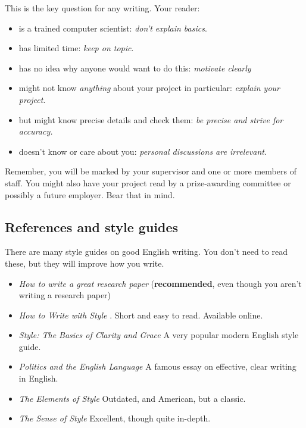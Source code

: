 \documentclass{l4proj}
\begin{document}
This is the key question for any writing. Your reader:

\begin{itemize}
    \item
          is a trained computer scientist: \emph{don't explain basics}.
    \item
          has limited time: \emph{keep on topic}.
    \item
          has no idea why anyone would want to do this: \emph{motivate clearly}
    \item
          might not know \emph{anything} about your project in particular:
          \emph{explain your project}.
    \item
          but might know precise details and check them: \emph{be precise and
              strive for accuracy.}
    \item
          doesn't know or care about you: \emph{personal discussions are
              irrelevant}.
\end{itemize}

Remember, you will be marked by your supervisor and one or more members
of staff. You might also have your project read by a prize-awarding
committee or possibly a future employer. Bear that in mind.

\subsection{References and style guides}
There are many style guides on good English writing. You don't need to
read these, but they will improve how you write.

\begin{itemize}
    \item
          \emph{How to write a great research paper} \cite{Pey17} (\textbf{recommended}, even
          though you aren't writing a research paper)
    \item
          \emph{How to Write with Style} \cite{Von80}. Short and easy to read. Available online.
    \item
          \emph{Style: The Basics of Clarity and Grace} \cite{Wil09} A very popular modern English 
          style guide.
    \item
          \emph{Politics and the English Language} \cite{Orw68}  A famous essay on effective, clear
          writing in English.
    \item
          \emph{The Elements of Style} \cite{StrWhi07} Outdated, and American, but a classic.
    \item
          \emph{The Sense of Style} \cite{Pin15} Excellent, though quite in-depth.
\end{itemize}
\end{document}
